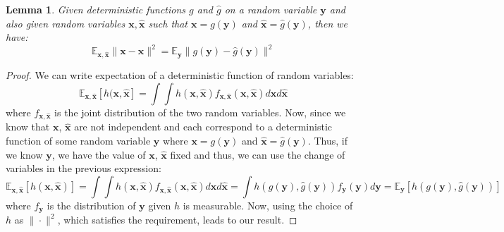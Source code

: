 \documentclass[11pt]{article}
\newcommand{\xh}[1]{\textcolor[HTML]{66CCFF}{#1}}
\def\rvx{{\mathbf{x}}}
\def\rvy{{\mathbf{y}}}
\def\vx{{\bm{x}}}
\def\vy{{\bm{y}}}
\newtheorem{lemma}{Lemma}[section]
\begin{document}
\vspace{0.2in}
\begin{lemma}
\label{change_of_var_lemma}
    Given deterministic functions $g$ and $\hat{g}$ on a random variable $\rvy$ and also given random variables $\rvx,\hat{\rvx}$
 such that $\rvx=g(\rvy)$ and $\hat{\rvx}=\hat{g}(\rvy)$, then we have:
 \[
 \mathbb{E}_{\rvx,\hat{\rvx}}\|\rvx-\hat{\rvx}\|^2 = \mathbb{E}_{\rvy}\|g(\rvy)-\hat{g}(\rvy)\|^2
 \]
 \end{lemma}
 \begin{proof}
     We can write expectation of a deterministic function of random variables: 
     \[
     \mathbb{E}_{\rvx,\hat{\rvx}}[h(\rvx,\hat{\rvx}] = \int\int h(\rvx,\hat{\rvx})f_{\rvx,\hat{\rvx}}(\vx,\hat{\vx})d\vx d\hat{\vx}
     \]
     where $f_{\rvx,\hat{\rvx}}$ is the joint distribution of the two random variables. Now, since we know that $\rvx$, $\hat{\rvx}$ are not independent and each correspond to a deterministic function of some random variable $\rvy$ where $\rvx=g(\rvy)$ and $\hat{\rvx}=\hat{g}(\rvy)$. Thus, if we know $\rvy$, we have the value of $\rvx$, $\hat{\rvx}$ fixed and thus, we can use the change of variables in the previous expression:
     \[
     \mathbb{E}_{\rvx,\hat{\rvx}}[h(\vx,\hat{\vx})] = \int\int h(\vx,\hat{\vx})f_{\rvx,\hat{\rvx}}(\vx,\hat{\vx})d\vx d\hat{\vx} = \int h(g(\vy),\hat{g}(\vy))f_\rvy(\vy)d\vy = \mathbb{E}_\rvy[ h(g(\vy),\hat{g}(\vy))]
     \]
     where $f_\rvy$ is the distribution of $\rvy$ given $h$ is measurable. Now, using the choice of $h$ as $\|\cdot \|^2$, which satisfies the requirement, leads to our result. 
 \end{proof}
\end{document}
